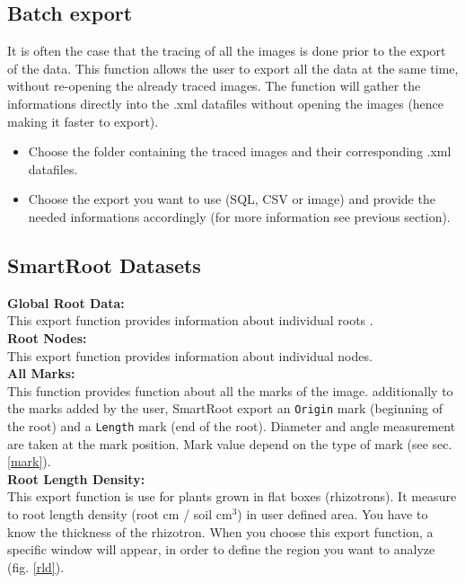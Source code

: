 \documentclass[a4paper,english,10pt]{report}
\begin{document}
\subsection{Batch export}

It is often the case that the tracing of all the images is done prior to the export of the data. This function allows the user to export all the data at the same time, without re-opening the already traced images. The function will gather the informations directly into the .xml datafiles without opening the images (hence making it faster to export).

\begin{itemize}
\item Choose the folder containing the traced images and their corresponding .xml datafiles.
\item Choose the export you want to use (SQL, CSV or image) and provide the needed informations accordingly (for more information see previous section).
\end{itemize}



\subsection{SmartRoot Datasets\\}

\noindent \textbf{Global Root Data:}\\ 
This export function provides information about individual roots .\\

\noindent \textbf{Root Nodes:\\} 
This export function provides information about individual nodes.\\

\noindent \textbf{All Marks:\\} 
This function provides function about all the marks of the image. additionally to the marks added by the user, SmartRoot export an \verb|Origin| mark (beginning of the root) and a \verb|Length| mark (end of the root). Diameter and angle measurement are taken at the mark position. Mark value depend on the type of mark (see sec. \ref{mark}).\\

\noindent \textbf{Root Length Density:\\} 
This export function is use for plants grown in flat boxes (rhizotrons). It measure to root length density (root cm / soil cm$^3$) in user defined area. You have to know the thickness of the rhizotron. When you choose this export function, a specific window will appear, in order to define the region you want to analyze (fig. \ref{rld}).\\
\end{document}

